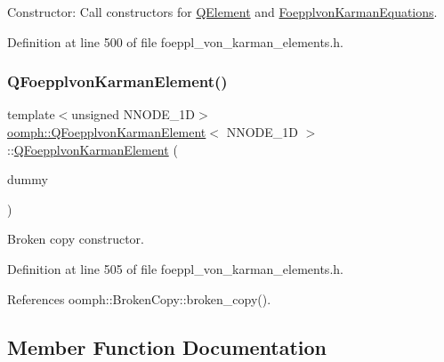 Constructor\+: Call constructors for \hyperlink{classoomph_1_1QElement}{Q\+Element} and \hyperlink{classoomph_1_1FoepplvonKarmanEquations}{Foepplvon\+Karman\+Equations}. 



Definition at line 500 of file foeppl\+\_\+von\+\_\+karman\+\_\+elements.\+h.

\mbox{\label{classoomph_1_1QFoepplvonKarmanElement_a602a5cfd9f1f79ed4bf3a35508b4ca7c}} 
\subsubsection{\texorpdfstring{Q\+Foepplvon\+Karman\+Element()}{QFoepplvonKarmanElement()}\hspace{0.1cm}{\footnotesize\ttfamily [2/2]}}
{\footnotesize\ttfamily template$<$unsigned N\+N\+O\+D\+E\+\_\+1D$>$ \\
\hyperlink{classoomph_1_1QFoepplvonKarmanElement}{oomph\+::\+Q\+Foepplvon\+Karman\+Element}$<$ N\+N\+O\+D\+E\+\_\+1D $>$\+::\hyperlink{classoomph_1_1QFoepplvonKarmanElement}{Q\+Foepplvon\+Karman\+Element} (\begin{DoxyParamCaption}\item[{const \hyperlink{classoomph_1_1QFoepplvonKarmanElement}{Q\+Foepplvon\+Karman\+Element}$<$ N\+N\+O\+D\+E\+\_\+1D $>$ \&}]{dummy }\end{DoxyParamCaption})\hspace{0.3cm}{\ttfamily [inline]}}



Broken copy constructor. 



Definition at line 505 of file foeppl\+\_\+von\+\_\+karman\+\_\+elements.\+h.



References oomph\+::\+Broken\+Copy\+::broken\+\_\+copy().



\subsection{Member Function Documentation}
\mbox{\label{classoomph_1_1QFoepplvonKarmanElement_a405228612fc3349bda3cb6965b740da6}} 
